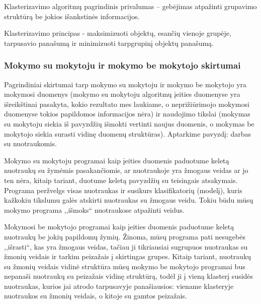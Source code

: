 Klasterizavimo algoritmų pagrindinis privalumas – gebėjimas atpažinti grupavimo
struktūrą be jokios išankstinės informacijos. 

Klasterizavimo principas - maksimizuoti objektų, esančių vienoje grupėje,
tarpusavio panašumą ir minimizuoti tarpgrupinį objektų panašumą.





\subsubsection{Mokymo su mokytoju ir mokymo be mokytojo skirtumai}

Pagrindiniai skirtumai tarp mokymo su mokytoju ir mokymo be mokytojo yra
mokymosi duomenys (mokymo su mokytoju algoritmų įeities duomenyse yra
išreikštinai pasakyta, kokio rezultato mes laukiame, o neprižiūrimojo mokymosi
duomenyse tokios papildomos informacijos nėra) ir naudojimo tikslai (mokymas
su mokytoju siekia iš pavyzdžių išmokti vertinti naujus duomenis, o mokymas be
mokytojo siekia surasti vidinę duomenų struktūras). Aptarkime pavyzdį: darbas
su nuotraukomis.

Mokymo su mokytoju programai kaip įeities duomenis paduotume keletą 
nuotraukų su žymėmis pasakančiomis, ar nuotraukoje yra žmogaus veidas ar jo ten
nėra, kitaip tariant, duotume keletą pavyzdžių su teisingais atsakymais.
Programa peržvelgs visas nuotraukas ir susikurs klasifikatorių (modelį), kuris
kažkokiu tikslumu galės atskirti nuotraukas su žmogaus veidu. Tokiu būdu mūsų
mokymo programa ,,išmoks`` nuotraukose atpažinti veidus.

Mokymosi be mokytojo programai kaip įeities duomenis paduotume keletą
nuotraukų be jokių papildomų žymių. Žinoma, mūsų programa pati nesugebės
,,išrasti``, kas yra žmogaus veidas, tačiau ji tikriausiai sugrupuos nuotraukas
su žmonių veidais ir tarkim peizažais į skirtingas grupes. Kitaip tariant,
nuotraukų su žmonių veidais vidinė struktūra mūsų mokymo be mokytojo programai
bus nepanaši nuotraukų su peizažais vidinę struktūrą, todėl ji į vieną klasterį
susidės nuotraukas, kurios jai atrodo tarpusavyje panašiausios: viename
klasteryje nuotraukos su žmonių veidais, o kitoje su gamtos peizažais.

